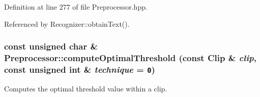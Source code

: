 Definition at line 277 of file Preprocessor.hpp.

Referenced by Recognizer::obtainText().\hypertarget{class_preprocessor_aaeb94a3b52b835bc26efebb40be25bc}{
\subsubsection[computeOptimalThreshold]{\setlength{\rightskip}{0pt plus 5cm}const unsigned char \& Preprocessor::computeOptimalThreshold (const {\bf Clip} \& {\em clip}, \/  const unsigned int \& {\em technique} = {\tt 0})}}
\label{class_preprocessor_aaeb94a3b52b835bc26efebb40be25bc}


Computes the optimal threshold value within a clip. 

